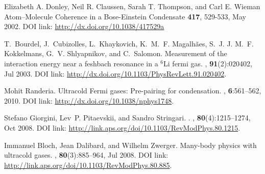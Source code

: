 \documentclass[a4paper,10pt]{article}
\begin{document}
\begin{thebibliography}{10}


Elizabeth A. Donley, Neil R. Claussen, Sarah T. Thompson, and Carl E. Wieman
\newblock Atom--Molecule Coherence in a Bose-Einstein Condensate
 \textbf{417}, 529-533, May 2002.
\newblock DOI link: \url{http://dx.doi.org/10.1038/417529a}

T.~Bourdel, J.~Cubizolles, L.~Khaykovich, K.~M.~F. Magalh{\~a}es, S.~J. J.
  M.~F. Kokkelmans, G.~V. Shlyapnikov, and C.~Salomon.
\newblock Measurement of the interaction energy near a feshbach resonance in a
  $^6${L}i fermi gas.
, \textbf{91}(2):020402, Jul 2003.
\newblock DOI link: \url{http://dx.doi.org/10.1103/PhysRevLett.91.020402}.

Mohit Randeria.
\newblock Ultracold {F}ermi gases: {P}re-pairing for condensation.
, \textbf{6}:561--562, 2010.
\newblock DOI link: \url{http://dx.doi.org/10.1038/nphys1748}.

Stefano Giorgini, Lev~P. Pitaevskii, and Sandro Stringari.
.
, \textbf{80}(4):1215--1274, Oct 2008.
\newblock DOI link: \url{http://link.aps.org/doi/10.1103/RevModPhys.80.1215}.

Immanuel Bloch, Jean Dalibard, and Wilhelm Zwerger.
\newblock Many-body physics with ultracold gases.
, \textbf{80}(3):885--964, Jul 2008.
\newblock DOI link: \url{http://link.aps.org/doi/10.1103/RevModPhys.80.885}.




\end{thebibliography}
\end{document}
